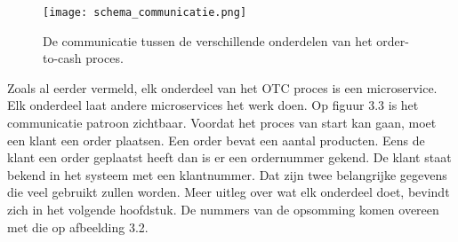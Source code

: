 \begin{figure}[h]
	\texttt{[image: schema\_communicatie.png]}
	\caption{De communicatie tussen de verschillende onderdelen van het order-to-cash proces.}
	\centering
\end{figure}
Zoals al eerder vermeld, elk onderdeel van het OTC proces is een microservice. Elk onderdeel laat andere microservices het werk doen.
Op figuur 3.3 is het communicatie patroon zichtbaar.
Voordat het proces van start kan gaan, moet een klant een order plaatsen. Een order bevat een aantal producten. Eens de klant een order geplaatst heeft dan is er een ordernummer gekend. De klant staat bekend in het systeem met een klantnummer. Dat zijn twee belangrijke gegevens die veel gebruikt zullen worden.
Meer uitleg over wat elk onderdeel doet, bevindt zich in het volgende hoofdstuk.
De nummers van de opsomming komen overeen met die op afbeelding 3.2.

